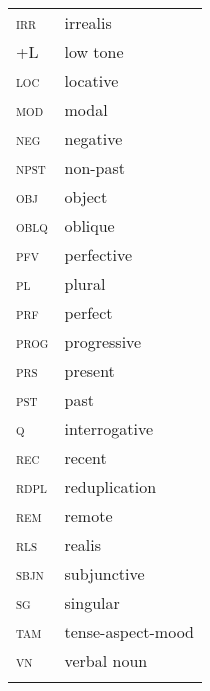 \documentclass[output=paper]{langsci/langscibook}
\begin{document}
\begin{tabularx}{.45\textwidth}{ll}
\textsc{irr}   & irrealis  \\
\textsc{+L}  & low tone  \\
\textsc{loc}  & locative  \\
\textsc{mod}  & modal  \\
\textsc{neg}  & negative  \\
\textsc{npst}  & non-past \\
\textsc{obj}  & object  \\
\textsc{oblq}  & oblique  \\
\textsc{pfv}  & perfective  \\
\textsc{pl}  & plural\\
\textsc{prf}  & perfect  \\ 
\textsc{prog}  & progressive \\ 
\textsc{prs}  & present\\
\textsc{pst}  & past  \\
\textsc{q}  & interrogative\\  
\textsc{rec}  & recent\\
\textsc{rdpl}  &reduplication  \\
\textsc{rem}  & remote  \\
\textsc{rls}  & realis\\
\textsc{sbjn}  & subjunctive\\  
\textsc{sg}  & singular  \\
\textsc{tam}  & tense-aspect-mood \textsc{}\\
\textsc{vn    }   & verbal noun\\
\\
\end{tabularx}
\largerpage[2]
 

{\sloppy
\printbibliography[heading=subbibliography,notkeyword=this]
}
\end{document}
